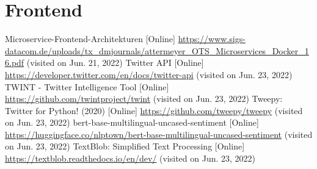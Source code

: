 \documentclass[conference]{IEEEtran}
\begin{document}
\section{Frontend}


\begin{thebibliography}{0}
    Microservice-Frontend-Architekturen [Online] \url{https://www.sigs-datacom.de/uploads/tx_dmjournals/attermeyer_OTS_Microservices_Docker_16.pdf} (visited on Jun. 21, 2022)
    Twitter API [Online] \url{https://developer.twitter.com/en/docs/twitter-api} (visited on Jun. 23, 2022)
    TWINT - Twitter Intelligence Tool [Online] \url{https://github.com/twintproject/twint} (visited on Jun. 23, 2022)
    Tweepy: Twitter for Python! (2020) [Online] \url{https://github.com/tweepy/tweepy} (visited on Jun. 23, 2022)
    bert-base-multilingual-uncased-sentiment [Online] \url{https://huggingface.co/nlptown/bert-base-multilingual-uncased-sentiment} (visited on Jun. 23, 2022)
    TextBlob: Simplified Text Processing [Online] \url{https://textblob.readthedocs.io/en/dev/} (visited on Jun. 23, 2022)

\end{thebibliography}
\end{document}
